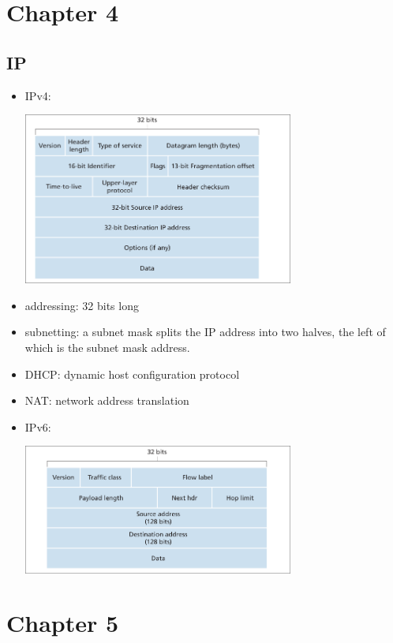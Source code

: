 \documentclass[11pt]{article}
\begin{document}
\section{Chapter 4}
\label{sec:org31ed8b8}
\subsection{IP}
\label{sec:orgd17a22a}
\begin{itemize}
\item IPv4:
\begin{center}
\includegraphics[width=0.7\textwidth]{datagram.png}
\end{center}
\item addressing: 32 bits long
\item subnetting: a subnet mask splits the IP address into two halves, the left of
which is the subnet mask address.
\item DHCP: dynamic host configuration protocol
\item NAT: network address translation
\item IPv6: \begin{center}
\includegraphics[width=0.7\textwidth]{datagram2.png}
\end{center}
\end{itemize}

\section{Chapter 5}
\label{sec:orgf8e2df1}
\end{document}

